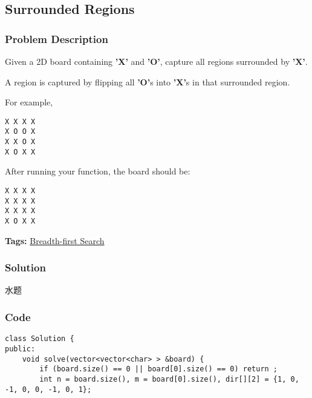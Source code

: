\documentclass{article}
\begin{document}
\begin{CJK*}{UTF8}{gkai}
\subsection{ Surrounded Regions }
\label{ Surrounded Regions }

\subsubsection*{Problem Description}
Given a 2D board containing \textbf{'X'} and \textbf{'O'}, capture all regions surrounded by \textbf{'X'}.

A region is captured by flipping all \textbf{'O'}s into \textbf{'X'}s in that surrounded region.

For example,


\begin{verbatim}
X X X X
X O O X
X X O X
X O X X
\end{verbatim}

After running your function, the board should be:
\begin{verbatim}
X X X X
X X X X
X X X X
X O X X
\end{verbatim}


\textbf{Tags: }
\hyperref[ Breadth-first Search ]{ Breadth-first Search }



\subsubsection*{Solution}
水题

\subsubsection*{Code}
\begin{lstlisting}
class Solution {
public:
    void solve(vector<vector<char> > &board) {
        if (board.size() == 0 || board[0].size() == 0) return ;
        int n = board.size(), m = board[0].size(), dir[][2] = {1, 0, -1, 0, 0, -1, 0, 1};
        

\end{lstlisting}
\end{CJK*}
\end{document}
